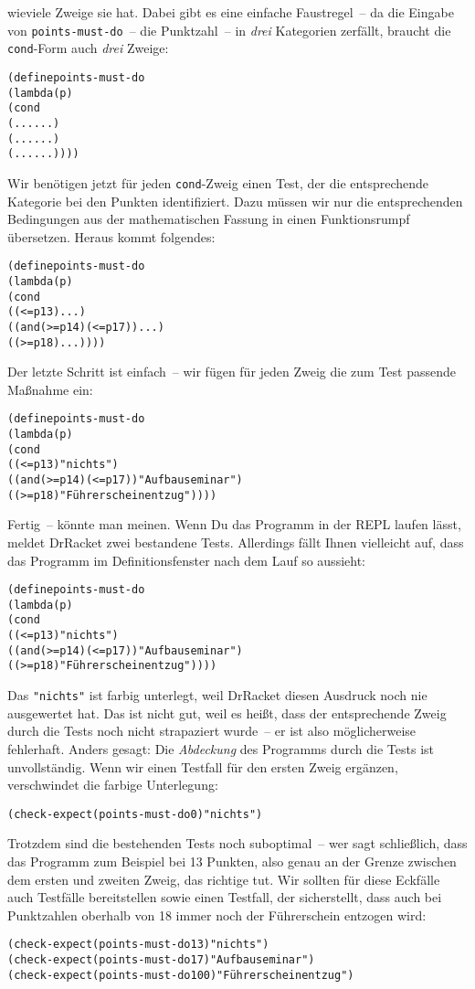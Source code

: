 wieviele Zweige sie hat.  Dabei gibt es eine einfache Faustregel~-- da
die Eingabe von \texttt{points-must-do}~-- die Punktzahl~-- in
\emph{drei} Kategorien zerfällt, braucht die \texttt{cond}-Form auch
\emph{drei} Zweige:
%
\begin{alltt}
(define points-must-do
  (lambda (p)
    (cond
      (... ...)
      (... ...)
      (... ...))))
\end{alltt}
%
Wir benötigen jetzt für jeden \texttt{cond}-Zweig einen Test, der die
entsprechende Kategorie bei den Punkten identifiziert.  Dazu müssen
wir nur die entsprechenden Bedingungen aus der mathematischen Fassung
in einen Funktionsrumpf übersetzen.  Heraus kommt folgendes:
%
\begin{alltt}
(define points-must-do
  (lambda (p)
    (cond
      ((<= p 13) ...)
      ((and (>= p 14) (<= p 17)) ...)
      ((>= p 18) ...))))
\end{alltt}
%
Der letzte Schritt ist einfach~-- wir fügen für jeden Zweig die zum
Test passende Maßnahme ein:
%
\begin{alltt}
(define points-must-do
  (lambda (p)
    (cond
      ((<= p 13) "nichts")
      ((and (>= p 14) (<= p 17)) "Aufbauseminar")
      ((>= p 18) "Führerscheinentzug"))))
\end{alltt}
%
Fertig~-- könnte man meinen.  Wenn Du das Programm in der REPL laufen lässt,
meldet DrRacket zwei bestandene Tests.  Allerdings fällt Ihnen
vielleicht auf, dass das Programm im Definitionsfenster nach dem Lauf
so aussieht:
%
\begin{alltt}
(define points-must-do
  (lambda (p)
    (cond
      ((<= p 13) \colorbox{featuregray}{"nichts"})
      ((and (>= p 14) (<= p 17)) "Aufbauseminar")
      ((>= p 18) "Führerscheinentzug"))))
\end{alltt}
%
Das \verb|"nichts"| ist farbig unterlegt, weil DrRacket diesen
Ausdruck noch nie ausgewertet hat.  Das ist nicht gut, weil es heißt,
dass der entsprechende Zweig durch die Tests noch nicht strapaziert
wurde~-- er ist also möglicherweise fehlerhaft.  Anders gesagt: Die
\textit{Abdeckung} des Programms durch die Tests ist
unvollständig.  Wenn wir einen Testfall für den ersten Zweig ergänzen,
verschwindet die farbige Unterlegung:
%
\begin{alltt}
(check-expect (points-must-do 0) "nichts")
\end{alltt}
%
Trotzdem sind die bestehenden Tests noch suboptimal~-- wer sagt
schließlich, dass das Programm zum Beispiel bei 13 Punkten, also genau
an der Grenze zwischen dem ersten und zweiten Zweig, das richtige tut.
Wir sollten für diese Eckfälle auch Testfälle
bereitstellen sowie einen Testfall, der sicherstellt, dass auch bei
Punktzahlen oberhalb von 18 immer noch der Führerschein entzogen wird:
%
\begin{alltt}
(check-expect (points-must-do 13) "nichts")
(check-expect (points-must-do 17) "Aufbauseminar")
(check-expect (points-must-do 100) "Führerscheinentzug")
\end{alltt}

